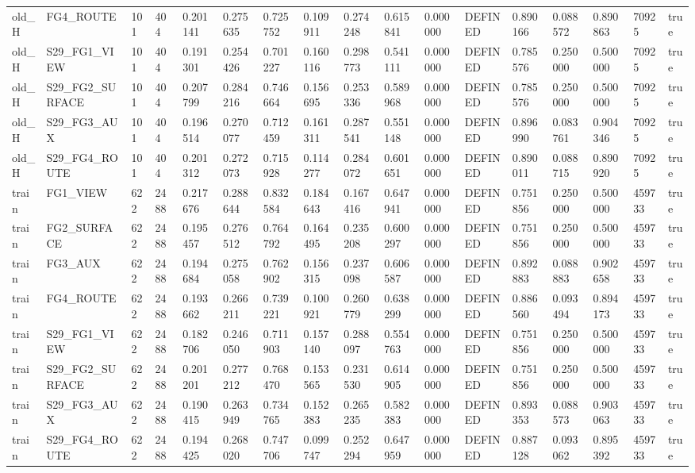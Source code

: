 \begin{tabular}{lllllllllllllllll}
old\_H & FG4\_ROUTE & 101 & 404 & 0.201141 & 0.275635 & 0.725752 & 0.109911 & 0.274248 & 0.615841 & 0.000000 & DEFINED & 0.890166 & 0.088572 & 0.890863 & 70925 & true \\
old\_H & S29\_FG1\_VIEW & 101 & 404 & 0.191301 & 0.254426 & 0.701227 & 0.160116 & 0.298773 & 0.541111 & 0.000000 & DEFINED & 0.785576 & 0.250000 & 0.500000 & 70925 & true \\
old\_H & S29\_FG2\_SURFACE & 101 & 404 & 0.207799 & 0.284216 & 0.746664 & 0.156695 & 0.253336 & 0.589968 & 0.000000 & DEFINED & 0.785576 & 0.250000 & 0.500000 & 70925 & true \\
old\_H & S29\_FG3\_AUX & 101 & 404 & 0.196514 & 0.270077 & 0.712459 & 0.161311 & 0.287541 & 0.551148 & 0.000000 & DEFINED & 0.896990 & 0.083761 & 0.904346 & 70925 & true \\
old\_H & S29\_FG4\_ROUTE & 101 & 404 & 0.201312 & 0.272073 & 0.715928 & 0.114277 & 0.284072 & 0.601651 & 0.000000 & DEFINED & 0.890011 & 0.088715 & 0.890920 & 70925 & true \\
train & FG1\_VIEW & 622 & 2488 & 0.217676 & 0.288644 & 0.832584 & 0.184643 & 0.167416 & 0.647941 & 0.000000 & DEFINED & 0.751856 & 0.250000 & 0.500000 & 459733 & true \\
train & FG2\_SURFACE & 622 & 2488 & 0.195457 & 0.276512 & 0.764792 & 0.164495 & 0.235208 & 0.600297 & 0.000000 & DEFINED & 0.751856 & 0.250000 & 0.500000 & 459733 & true \\
train & FG3\_AUX & 622 & 2488 & 0.194684 & 0.275058 & 0.762902 & 0.156315 & 0.237098 & 0.606587 & 0.000000 & DEFINED & 0.892883 & 0.088883 & 0.902658 & 459733 & true \\
train & FG4\_ROUTE & 622 & 2488 & 0.193662 & 0.266211 & 0.739221 & 0.100921 & 0.260779 & 0.638299 & 0.000000 & DEFINED & 0.886560 & 0.093494 & 0.894173 & 459733 & true \\
train & S29\_FG1\_VIEW & 622 & 2488 & 0.182706 & 0.246050 & 0.711903 & 0.157140 & 0.288097 & 0.554763 & 0.000000 & DEFINED & 0.751856 & 0.250000 & 0.500000 & 459733 & true \\
train & S29\_FG2\_SURFACE & 622 & 2488 & 0.201201 & 0.277212 & 0.768470 & 0.153565 & 0.231530 & 0.614905 & 0.000000 & DEFINED & 0.751856 & 0.250000 & 0.500000 & 459733 & true \\
train & S29\_FG3\_AUX & 622 & 2488 & 0.190415 & 0.263949 & 0.734765 & 0.152383 & 0.265235 & 0.582383 & 0.000000 & DEFINED & 0.893353 & 0.088573 & 0.903063 & 459733 & true \\
train & S29\_FG4\_ROUTE & 622 & 2488 & 0.194425 & 0.268020 & 0.747706 & 0.099747 & 0.252294 & 0.647959 & 0.000000 & DEFINED & 0.887128 & 0.093062 & 0.895392 & 459733 & true \\

\end{tabular}
